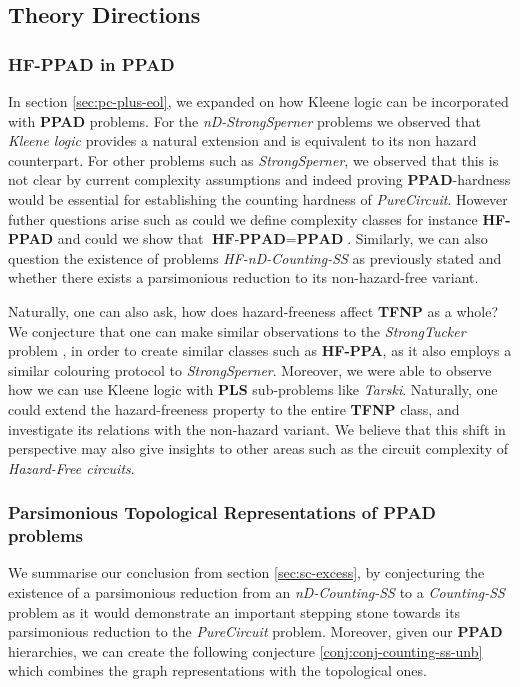 
\subsection{Theory Directions}


\subsubsection{\textbf{HF-PPAD} in  \textbf{PPAD}}

In section \ref{sec:pc-plus-eol}, we expanded on
how Kleene logic can be incorporated with \textbf{PPAD} problems. For
the \textit{nD-StrongSperner} problems we observed that \textit{Kleene logic}
provides a natural extension and is equivalent to its non hazard counterpart.
For other problems such as \textit{StrongSperner}, we observed that this
is not clear by current complexity assumptions and indeed proving \textbf{PPAD}-hardness
would be essential for establishing the counting hardness of \textit{PureCircuit}.
However futher questions arise such as could we define
complexity classes for instance \textbf{HF-PPAD} and could we show that
$\textbf{HF-PPAD} = \textbf{PPAD}$.
Similarly, we can also question the existence of problems
\textit{HF-nD-Counting-SS} as previously stated and whether there
exists a parsimonious reduction to its non-hazard-free variant.


Naturally, one can also ask, how does hazard-freeness
affect \textbf{TFNP} as a whole? We conjecture that one can make
similar observations to the \textit{StrongTucker} problem \cite{aisenberg_2DTuckerPPA_2020},
in order to create similar classes such as \textbf{HF-PPA}, as
it also employs a similar colouring protocol to \textit{StrongSperner}.
Moreover, we were able to observe how we can use Kleene logic with
\textbf{PLS} sub-problems like \textit{Tarski}. Naturally,
one could extend the hazard-freeness property to the entire \textbf{TFNP} class,
and investigate its relations with the non-hazard variant. We believe that this shift
in perspective may also give insights to other areas such as the circuit complexity of \textit{Hazard-Free circuits}.


\subsubsection{Parsimonious Topological Representations of \textbf{PPAD} problems}

We summarise our conclusion from section \ref{sec:sc-excess}, by conjecturing
the existence of a parsimonious reduction from an \textit{nD-Counting-SS} to a
\textit{Counting-SS} problem as it would demonstrate an important stepping
stone towards its parsimonious reduction to the \textit{PureCircuit} problem.
Moreover, given our \textbf{PPAD} hierarchies, we can create the following conjecture  \ref{conj:conj-counting-ss-unb}
which combines the graph representations with the topological ones.


